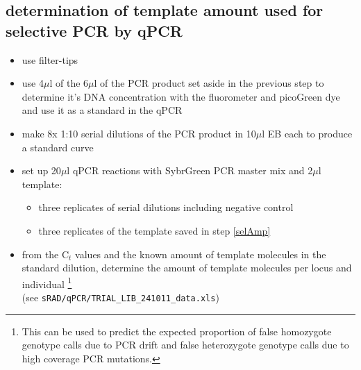 \subsection
{determination of template amount used for selective PCR by qPCR}
\begin{itemize}
\item {\color{red}use filter-tips}
\item use 4$\mu$l of the 6$\mu$l of the PCR product set aside in the previous step to determine it's DNA concentration with the fluorometer and picoGreen dye and use it as a standard in the qPCR
\item make 8x 1:10 serial dilutions of the PCR product in 10$\mu$l EB each to produce a standard curve
\item set up 20$\mu$l qPCR reactions with SybrGreen PCR master mix and 2$\mu$l template: 
	\begin{itemize}
	\item three replicates of serial dilutions including negative control
	\item three replicates of the template saved in step \ref{selAmp}
	\end{itemize}
\item from the C$_{t}$ values and the known amount of template molecules in the standard dilution, determine the amount of template molecules per locus and individual \footnote{This can be used to predict the expected proportion of false homozygote genotype calls due to PCR drift and false heterozygote genotype calls due to high coverage PCR mutations.} \\(see \texttt{sRAD/qPCR/TRIAL\_LIB\_241011\_data.xls})
\end{itemize}


